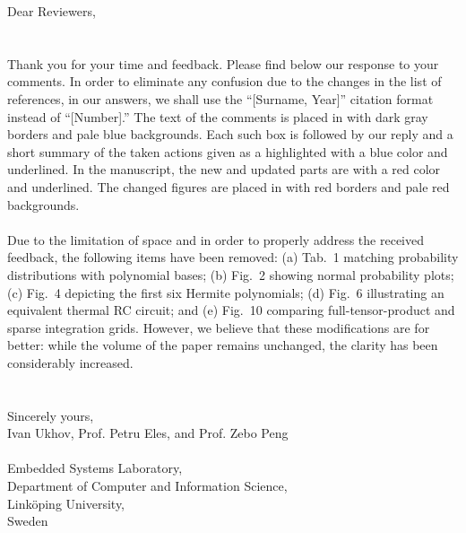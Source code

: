 Dear Reviewers,
\\
\\
\\
\noindent Thank you for your time and feedback.
Please find below our response to your comments.
In order to eliminate any confusion due to the changes in the list of references, in our answers, we shall use the ``[Surname, Year]'' citation format instead of ``[Number].''
The text of the comments is placed in  with dark gray borders and pale blue backgrounds.
Each such box is followed by our reply and a short summary of the taken actions given as a  highlighted with a blue color and underlined.
In the manuscript, the new and updated parts are  with a red color and underlined.
The changed figures are placed in  with red borders and pale red backgrounds.
\\
\\
Due to the limitation of space and in order to properly address the received feedback, the following items have been removed:
(a) Tab.~1 matching probability distributions with polynomial bases;
(b) Fig.~2 showing normal probability plots;
(c) Fig.~4 depicting the first six Hermite polynomials;
(d) Fig.~6 illustrating an equivalent thermal RC circuit; and
(e) Fig.~10 comparing full-tensor-product and sparse integration grids.
However, we believe that these modifications are for better: while the volume of the paper remains unchanged, the clarity has been considerably increased.
\\
\\
\\
\noindent Sincerely yours,\\
Ivan Ukhov, Prof. Petru Eles, and Prof. Zebo Peng
\\
\\
\noindent Embedded Systems Laboratory,\\
Department of Computer and Information Science,\\
Link\"{o}ping University,\\
Sweden
